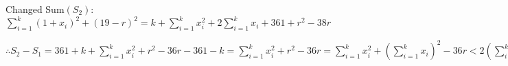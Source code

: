 \documentclass[a4paper,10pt]{article}
\begin{document}
    Changed  Sum$(S_{2})$: $\sum_{i=1}^{k} (1+x_{i})^2 + (19-r)^2=k+ \sum_{i=1}^{k} x_{i}^2 + 2 \sum_{i=1}^{k} x_{i} + 361 + r^2 -38r$
   
    $\therefore  S_{2}-S_{1}=361+k+ \sum_{i=1}^{k} x_{i}^2 +r^2 -36r -361-k = \sum_{i=1}^{k} x_{i}^2 +r^2 -36r = \sum_{i=1}^{k} x_{i}^2 +(\sum_{i=1}^{k} x_{i})^2 - 36r < 2(\sum_{i=1}^{k} x_{i})^2 -36r=2r(r-18) \le 0$ \\

    \begin{center}
      \\
    \end{center}

    
    
    
    
\end{document}
